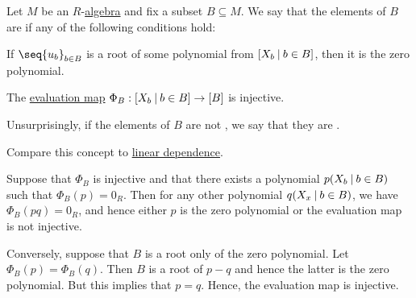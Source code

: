 \begin{definition}\label{def:algebraic_dependence}\mimprovised
  Let \( M \) be an \( R \)-\hyperref[def:algebra_over_ring]{algebra} and fix a subset \( B \subseteq M \). We say that the elements of \( B \) are  if any of the following conditions hold:

  \begin{thmenum}
     If \( \seq{ u_b }_{b \in B} \) is a root of some polynomial from \( \Bbbk[X_b \given b \in B] \), then it is the zero polynomial.

     The \hyperref[thm:polynomial_semiring_universal_property]{evaluation map} \( \Phi_B: \Bbbk[X_b \given b \in B] \to \Bbbk[B] \) is injective.
  \end{thmenum}

  Unsurprisingly, if the elements of \( B \) are not , we say that they are .

  Compare this concept to \hyperref[def:linear_dependence]{linear dependence}.
\end{definition}
\begin{defproof}
   Suppose that \( \Phi_B \) is injective and that there exists a polynomial \( p(X_b \given b \in B) \) such that \( \Phi_B(p) = 0_R \). Then for any other polynomial \( q(X_x \given b \in B) \), we have \( \Phi_B(p q) = 0_R \), and hence either \( p \) is the zero polynomial or the evaluation map is not injective.

   Conversely, suppose that \( B \) is a root only of the zero polynomial. Let \( \Phi_B(p) = \Phi_B(q) \). Then \( B \) is a root of \( p - q \) and hence the latter is the zero polynomial. But this implies that \( p = q \). Hence, the evaluation map is injective.
\end{defproof}
